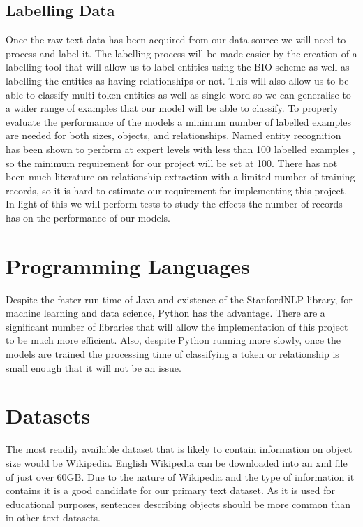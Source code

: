 \documentclass[11pt,oneside]{book}
\begin{document}
\subsection{Labelling Data}
Once the raw text data has been acquired from our data source we will need to process and label it. The labelling process will be made easier by the creation of a labelling tool that will allow us to label entities using the BIO scheme as well as labelling the entities as having relationships or not. This will also allow us to be able to classify multi-token entities as well as single word so we can generalise to a wider range of examples that our model will be able to classify. To properly evaluate the performance of the models a minimum number of labelled examples are needed for both sizes, objects, and relationships.  Named entity recognition has been shown to perform at expert levels with less than 100 labelled examples \citep{not_many_training_ner}, so the minimum requirement for our project will be set at 100. There has not been much literature on relationship extraction with a limited number of training records, so it is hard to estimate our requirement for implementing this project. In light of this we will perform tests to study the effects the number of records has on the performance of our models. 

\section{Programming Languages}
Despite the faster run time of Java and existence of the StanfordNLP library, for machine learning and data science, Python has the advantage. There are a significant number of libraries that will allow the implementation of this project to be much more efficient. Also, despite Python running more slowly, once the models are trained the processing time of classifying a token or relationship is small enough that it will not be an issue.

\section{Datasets}
The most readily available dataset that is likely to contain information on object size would be Wikipedia. English Wikipedia can be downloaded into an xml file of just over 60GB. Due to the nature of Wikipedia and the type of information it contains it is a good candidate for our primary text dataset. As it is used for educational purposes, sentences describing objects should be more common than in other text datasets.
\end{document}
